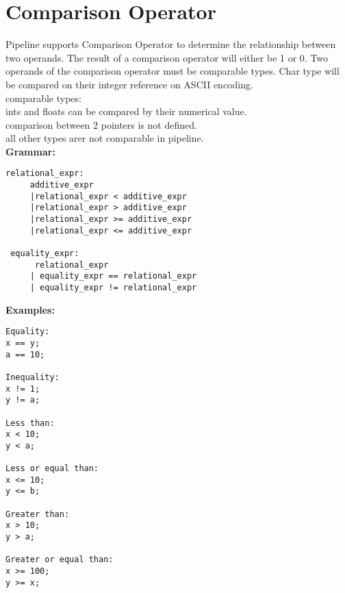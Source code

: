 \documentclass[./LRM_main.tex]{subfiles}
\begin{document}
\section{Comparison Operator}
Pipeline supports Comparison Operator to determine the relationship between two operands. The result of a comparison operator will either be 1 or 0. Two operands of the comparison operator must be comparable types. Char type will be compared on their integer reference on ASCII encoding.\\
comparable types:\\
ints and floats can be compared by their numerical value.\\
comparison between 2 pointers is not defined.\\
all other types arer not comparable in pipeline.\\
\vspace{1 mm}
\textbf{Grammar:}
\begin{lstlisting}
relational_expr:
     additive_expr
     |relational_expr < additive_expr
     |relational_expr > additive_expr
     |relational_expr >= additive_expr
     |relational_expr <= additive_expr

 equality_expr:
      relational_expr 
     | equality_expr == relational_expr
     | equality_expr != relational_expr

\end{lstlisting}
\vspace{1 mm}
\textbf{Examples:}
\begin{lstlisting}
Equality:
x == y;
a == 10;

Inequality:
x != 1;
y != a;

Less than:
x < 10;
y < a;

Less or equal than:
x <= 10;
y <= b;

Greater than:
x > 10;
y > a;

Greater or equal than:
x >= 100;
y >= x;

\end{lstlisting}
\end{document}
